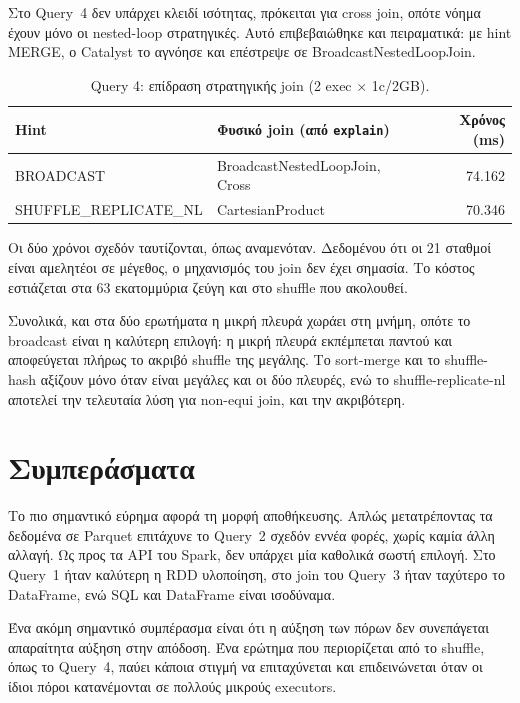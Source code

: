 \documentclass[11pt]{article}
\newcommand{\code}[1]{\texttt{\small #1}}
\newcommand{\en}[1]{\textenglish{#1}}
\begin{document}
Στο \en{Query}~4 δεν υπάρχει κλειδί ισότητας, πρόκειται για \en{cross join}, οπότε
νόημα έχουν μόνο οι \en{nested-loop} στρατηγικές. Αυτό επιβεβαιώθηκε και πειραματικά:
με \en{hint} \en{MERGE}, ο \en{Catalyst} το αγνόησε και επέστρεψε σε
\en{BroadcastNestedLoopJoin}.

\begin{table}[h]\centering
\begin{tabular}{llr}
\toprule
\en{Hint} & Φυσικό \en{join} (από \code{explain}) & Χρόνος (ms) \\
\midrule
\en{BROADCAST}              & \en{BroadcastNestedLoopJoin}, \en{Cross} & 74.162 \\
\en{SHUFFLE\_REPLICATE\_NL} & \en{CartesianProduct}                    & 70.346 \\
\bottomrule
\end{tabular}
\caption{Query 4: επίδραση στρατηγικής join (2 \en{exec} $\times$ 1\en{c}/2\en{GB}).}
\end{table}

Οι δύο χρόνοι σχεδόν ταυτίζονται, όπως αναμενόταν. Δεδομένου ότι οι 21 σταθμοί είναι
αμελητέοι σε μέγεθος, ο μηχανισμός του \en{join} δεν έχει σημασία. Tο κόστος
εστιάζεται στα 63 εκατομμύρια ζεύγη και στο \en{shuffle} που ακολουθεί.

Συνολικά, και στα δύο ερωτήματα η μικρή πλευρά χωράει στη μνήμη, οπότε το
\en{broadcast} είναι η καλύτερη επιλογή: η μικρή πλευρά εκπέμπεται παντού και
αποφεύγεται πλήρως το ακριβό \en{shuffle} της μεγάλης. Το \en{sort-merge} και το
\en{shuffle-hash} αξίζουν μόνο όταν είναι μεγάλες και οι δύο πλευρές, ενώ το
\en{shuffle-replicate-nl} αποτελεί την τελευταία λύση για \en{non-equi join}, και την
ακριβότερη.

\section{Συμπεράσματα}

Το πιο σημαντικό εύρημα αφορά τη μορφή αποθήκευσης. Απλώς μετατρέποντας τα δεδομένα σε
\en{Parquet} επιτάχυνε το \en{Query}~2 σχεδόν εννέα φορές, χωρίς καμία άλλη αλλαγή. 
Ως προς τα \en{API} του \en{Spark}, δεν υπάρχει μία καθολικά σωστή επιλογή. Στο  \en{Query}~1 
ήταν καλύτερη η \en{RDD} υλοποίηση, στο \en{join} του \en{Query}~3
ήταν ταχύτερο το \en{DataFrame}, ενώ \en{SQL} και \en{DataFrame} είναι ισοδύναμα.

Ένα ακόμη σημαντικό συμπέρασμα είναι ότι η αύξηση των πόρων δεν συνεπάγεται απαραίτητα αύξηση στην απόδοση.
Ένα ερώτημα που περιορίζεται από το \en{shuffle}, όπως το \en{Query}~4, παύει κάποια στιγμή να
επιταχύνεται και επιδεινώνεται όταν οι ίδιοι πόροι κατανέμονται σε πολλούς μικρούς \en{executors}.
\end{document}
